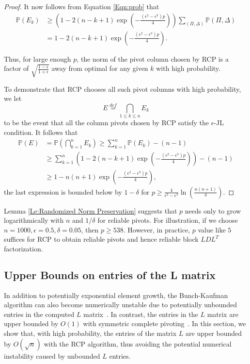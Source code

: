 \documentclass[11pt]{article}
\begin{document}
\begin{proof}
It now follows from Equation \eqref{Eqn:prob} that  
\begin{align*}
\mathbb{P}(E_k) & \ge \left( 1 - 2 (n - k + 1) \exp \left( - \frac{ (\epsilon^2 - \epsilon^3) p }{4} \right) \right) \sum_{\left(\Pi, \Delta\right)} \mathbb{P}\left(\Pi, \Delta\right) \\
& = 1- 2 (n - k + 1) \exp \left( - \frac{ (\epsilon^2 - \epsilon^3) p }{4} \right).
\end{align*}

Thus, for large enough $p$, the norm of the pivot column  chosen by RCP is a factor of ${\displaystyle \sqrt{ \frac{1 - \epsilon}{1 + \epsilon}}}$ away from optimal for any given $k$ with high probability. 

To demonstrate that RCP chooses all such pivot columns with high probability, we let  
\[{\displaystyle E \stackrel{def}{=} \bigcap_{1 \le k \le n} E_k }\]
to be the event that all the column pivots chosen by RCP satisfy the $\epsilon$-JL condition. It follows that 
 \begin{align*}
\mathbb{P} \left( E \right) & = \mathbb{P} \left( \bigcap_{k = 1}^n E_k \right) \ge \sum_{k = 1}^n \mathbb{P}(E_k) - (n - 1)  \\
& \ge \sum_{k = 1}^n \left( 1 - 2 (n - k + 1) \exp \left( - \frac{ (\epsilon^2 - \epsilon^3) p }{4} \right) \right) - (n - 1)  \\
& \ge 1 - n (n + 1) \exp \left( - \frac{ (\epsilon^2 - \epsilon^3) p }{4} \right), 
\end{align*}
the last expression is bounded below by $1 - \delta$ for $p \ge \frac{4}{\epsilon^2 - \epsilon^3} \ln{ \left( \frac{n (n + 1)}{\delta} \right) }$.  
\end{proof}

Lemma \ref{Le:Randomized Norm Preservation} suggests that $p$ needs only to grow logarithmically with $n$ and $1/\delta$ for reliable pivots. For illustration, if we choose $n = 1000, \epsilon = 0.5, \delta = 0.05$, then $p \ge 538$. However, in practice, $p$ value like $5$ suffices for RCP to obtain reliable pivots and hence reliable block $LDL^T$ factorization.

\subsection{Upper Bounds on entries of the L matrix} \label{Sec:Analysis of bounds for L}
In addition to potentially exponential element growth, the Bunch-Kaufman algorithm can also become numerically unstable 
due to potentially unbounded entries in the computed $L$ matrix~\cite{higham1997stability}. In contrast, the entries in the $L$ matrix are upper bounded by $O(1)$ with symmetric complete pivoting~\cite{bunch1971direct}. In this section, we show that, with high probability, the entries of the matrix $L$ are upper bounded by $O\left(\sqrt{n}\right)$ with the RCP algorithm, thus avoiding the potential numerical instability caused by unbounded $L$ entries. 
\end{document}
